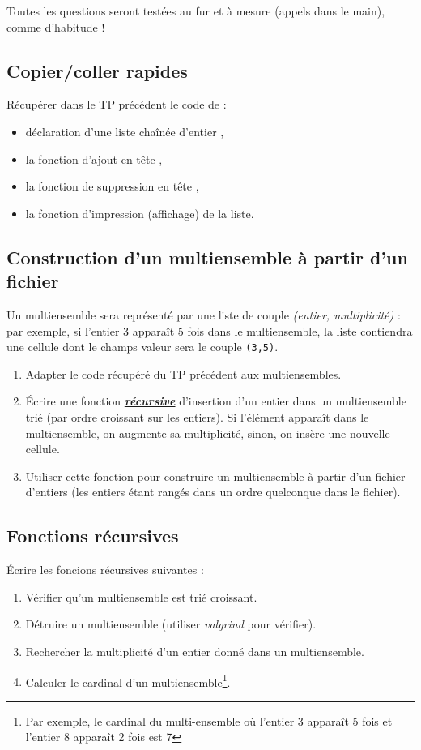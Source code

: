 \documentclass[final, pdftex, a4paper, openbib, ]{article}
\begin{document}
Toutes les questions seront testées au fur et à mesure (appels dans le main), comme d'habitude !


\subsection{Copier/coller rapides}
		
Récupérer dans le TP précédent le code de :
	\begin{itemize}
		\item déclaration d'une liste chaînée d'entier ,
		\item la fonction d'ajout en tête ,
		\item la fonction de suppression en tête ,
		\item la fonction d'impression (affichage) de la liste.
	\end{itemize}


\subsection{Construction d'un multiensemble à partir d'un fichier}
Un multiensemble sera représenté par une liste de couple \textit{(entier, multiplicité)} : par exemple, si l'entier 3 apparaît 5 fois dans le multiensemble, la liste contiendra une cellule dont le champs valeur sera le couple \texttt{(3,5)}.
	\begin{enumerate}
		\item Adapter le code récupéré du TP précédent aux multiensembles.
		\item Écrire une fonction \textbf{\underline{\textit{récursive}}} d'insertion d'un entier dans un multiensemble trié (par ordre croissant sur les entiers). Si l'élément apparaît dans le multiensemble, on augmente sa multiplicité, sinon, on
		insère une nouvelle cellule.
		\item Utiliser cette fonction pour construire un multiensemble à partir d'un fichier d'entiers (les entiers étant rangés dans un ordre quelconque dans le fichier).
	\end{enumerate}


\subsection{Fonctions récursives}

Écrire les foncions récursives suivantes :
\begin{enumerate}
	\item Vérifier qu'un multiensemble est trié croissant.
	\item Détruire un multiensemble (utiliser \textit{valgrind} pour vérifier).
	\item Rechercher la multiplicité d'un entier donné dans un multiensemble.
	\item Calculer le cardinal d'un multiensemble\footnote{Par exemple, le cardinal du multi-ensemble où l’entier 3 apparaît 5 fois et l’entier 8 apparaît 2 fois est 7}.
\end{enumerate}
\end{document}
